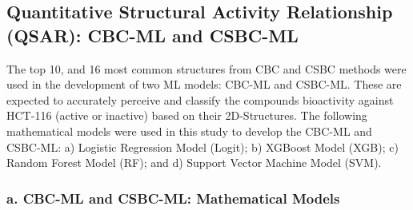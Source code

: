 \subsection*{Quantitative Structural Activity Relationship (QSAR): CBC-ML and CSBC-ML}
The top 10, and 16 most common structures from CBC and CSBC methods were used in the development of two ML models: CBC-ML and CSBC-ML. These are expected to accurately perceive and classify the compounds bioactivity against HCT-116 (active or inactive) based on their 2D-Structures. The following mathematical models were used in this study to develop the CBC-ML and CSBC-ML: a) Logistic Regression Model (Logit); b) XGBoost Model (XGB); c) Random Forest Model (RF); and d) Support Vector Machine Model (SVM). 

\subsubsection*{a. CBC-ML and CSBC-ML: Mathematical Models}
\FloatBarrier %

